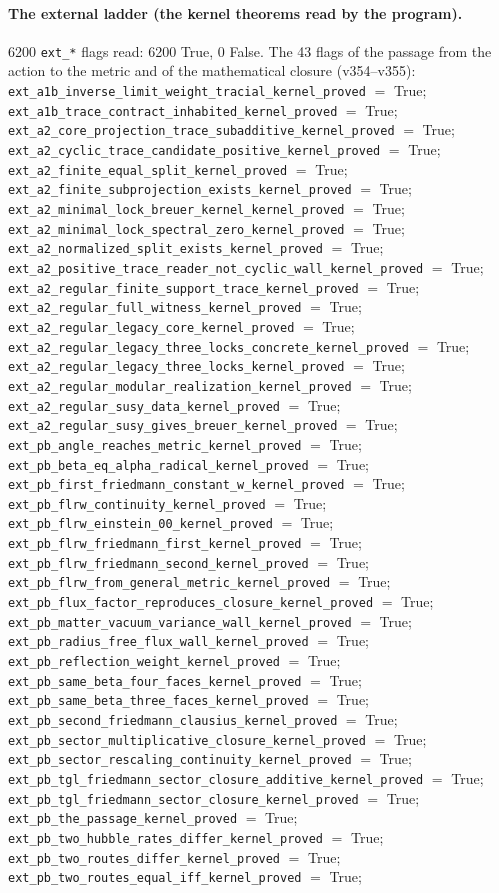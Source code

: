 \documentclass[11pt]{article}
\theoremstyle{definition}\newtheorem{deriv}{Derivation}
\begin{document}
\paragraph*{The external ladder (the kernel theorems read by the program).} 6200 \texttt{ext\_*} flags read: 6200 True, 0 False. The 43 flags of the passage from the action to the metric and of the mathematical closure (v354--v355): \texttt{ext\_a1b\_inverse\_limit\_weight\_tracial\_kernel\_proved} $=$ True; \texttt{ext\_a1b\_trace\_contract\_inhabited\_kernel\_proved} $=$ True; \texttt{ext\_a2\_core\_projection\_trace\_subadditive\_kernel\_proved} $=$ True; \texttt{ext\_a2\_cyclic\_trace\_candidate\_positive\_kernel\_proved} $=$ True; \texttt{ext\_a2\_finite\_equal\_split\_kernel\_proved} $=$ True; \texttt{ext\_a2\_finite\_subprojection\_exists\_kernel\_proved} $=$ True; \texttt{ext\_a2\_minimal\_lock\_breuer\_kernel\_kernel\_proved} $=$ True; \texttt{ext\_a2\_minimal\_lock\_spectral\_zero\_kernel\_proved} $=$ True; \texttt{ext\_a2\_normalized\_split\_exists\_kernel\_proved} $=$ True; \texttt{ext\_a2\_positive\_trace\_reader\_not\_cyclic\_wall\_kernel\_proved} $=$ True; \texttt{ext\_a2\_regular\_finite\_support\_trace\_kernel\_proved} $=$ True; \texttt{ext\_a2\_regular\_full\_witness\_kernel\_proved} $=$ True; \texttt{ext\_a2\_regular\_legacy\_core\_kernel\_proved} $=$ True; \texttt{ext\_a2\_regular\_legacy\_three\_locks\_concrete\_kernel\_proved} $=$ True; \texttt{ext\_a2\_regular\_legacy\_three\_locks\_kernel\_proved} $=$ True; \texttt{ext\_a2\_regular\_modular\_realization\_kernel\_proved} $=$ True; \texttt{ext\_a2\_regular\_susy\_data\_kernel\_proved} $=$ True; \texttt{ext\_a2\_regular\_susy\_gives\_breuer\_kernel\_proved} $=$ True; \texttt{ext\_pb\_angle\_reaches\_metric\_kernel\_proved} $=$ True; \texttt{ext\_pb\_beta\_eq\_alpha\_radical\_kernel\_proved} $=$ True; \texttt{ext\_pb\_first\_friedmann\_constant\_w\_kernel\_proved} $=$ True; \texttt{ext\_pb\_flrw\_continuity\_kernel\_proved} $=$ True; \texttt{ext\_pb\_flrw\_einstein\_00\_kernel\_proved} $=$ True; \texttt{ext\_pb\_flrw\_friedmann\_first\_kernel\_proved} $=$ True; \texttt{ext\_pb\_flrw\_friedmann\_second\_kernel\_proved} $=$ True; \texttt{ext\_pb\_flrw\_from\_general\_metric\_kernel\_proved} $=$ True; \texttt{ext\_pb\_flux\_factor\_reproduces\_closure\_kernel\_proved} $=$ True; \texttt{ext\_pb\_matter\_vacuum\_variance\_wall\_kernel\_proved} $=$ True; \texttt{ext\_pb\_radius\_free\_flux\_wall\_kernel\_proved} $=$ True; \texttt{ext\_pb\_reflection\_weight\_kernel\_proved} $=$ True; \texttt{ext\_pb\_same\_beta\_four\_faces\_kernel\_proved} $=$ True; \texttt{ext\_pb\_same\_beta\_three\_faces\_kernel\_proved} $=$ True; \texttt{ext\_pb\_second\_friedmann\_clausius\_kernel\_proved} $=$ True; \texttt{ext\_pb\_sector\_multiplicative\_closure\_kernel\_proved} $=$ True; \texttt{ext\_pb\_sector\_rescaling\_continuity\_kernel\_proved} $=$ True; \texttt{ext\_pb\_tgl\_friedmann\_sector\_closure\_additive\_kernel\_proved} $=$ True; \texttt{ext\_pb\_tgl\_friedmann\_sector\_closure\_kernel\_proved} $=$ True; \texttt{ext\_pb\_the\_passage\_kernel\_proved} $=$ True; \texttt{ext\_pb\_two\_hubble\_rates\_differ\_kernel\_proved} $=$ True; \texttt{ext\_pb\_two\_routes\_differ\_kernel\_proved} $=$ True; \texttt{ext\_pb\_two\_routes\_equal\_iff\_kernel\_proved} $=$ True; 
\end{document}
